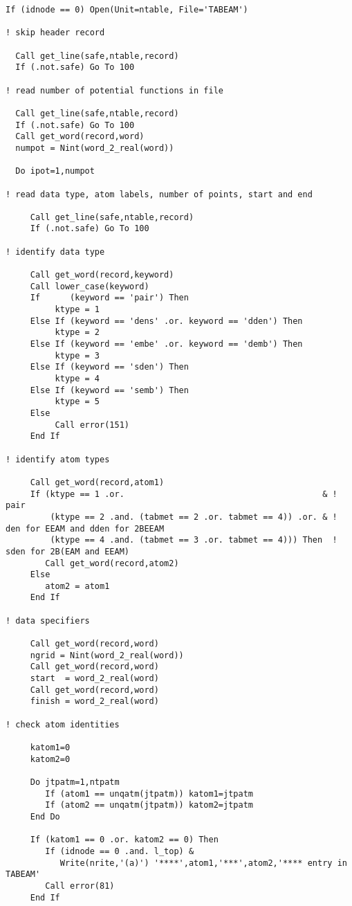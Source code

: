 \begin{lstlisting}[style=sFortran,caption={Add two numbers function}]
  If (idnode == 0) Open(Unit=ntable, File='TABEAM')

! skip header record

  Call get_line(safe,ntable,record)
  If (.not.safe) Go To 100

! read number of potential functions in file

  Call get_line(safe,ntable,record)
  If (.not.safe) Go To 100
  Call get_word(record,word)
  numpot = Nint(word_2_real(word))

  Do ipot=1,numpot

! read data type, atom labels, number of points, start and end

     Call get_line(safe,ntable,record)
     If (.not.safe) Go To 100

! identify data type

     Call get_word(record,keyword)
     Call lower_case(keyword)
     If      (keyword == 'pair') Then
          ktype = 1
     Else If (keyword == 'dens' .or. keyword == 'dden') Then
          ktype = 2
     Else If (keyword == 'embe' .or. keyword == 'demb') Then
          ktype = 3
     Else If (keyword == 'sden') Then
          ktype = 4
     Else If (keyword == 'semb') Then
          ktype = 5
     Else
          Call error(151)
     End If

! identify atom types

     Call get_word(record,atom1)
     If (ktype == 1 .or.                                        & ! pair
         (ktype == 2 .and. (tabmet == 2 .or. tabmet == 4)) .or. & ! den for EEAM and dden for 2BEEAM
         (ktype == 4 .and. (tabmet == 3 .or. tabmet == 4))) Then  ! sden for 2B(EAM and EEAM)
        Call get_word(record,atom2)
     Else
        atom2 = atom1
     End If

! data specifiers

     Call get_word(record,word)
     ngrid = Nint(word_2_real(word))
     Call get_word(record,word)
     start  = word_2_real(word)
     Call get_word(record,word)
     finish = word_2_real(word)

! check atom identities

     katom1=0
     katom2=0

     Do jtpatm=1,ntpatm
        If (atom1 == unqatm(jtpatm)) katom1=jtpatm
        If (atom2 == unqatm(jtpatm)) katom2=jtpatm
     End Do

     If (katom1 == 0 .or. katom2 == 0) Then
        If (idnode == 0 .and. l_top) &
           Write(nrite,'(a)') '****',atom1,'***',atom2,'**** entry in TABEAM'
        Call error(81)
     End If


\end{lstlisting}
